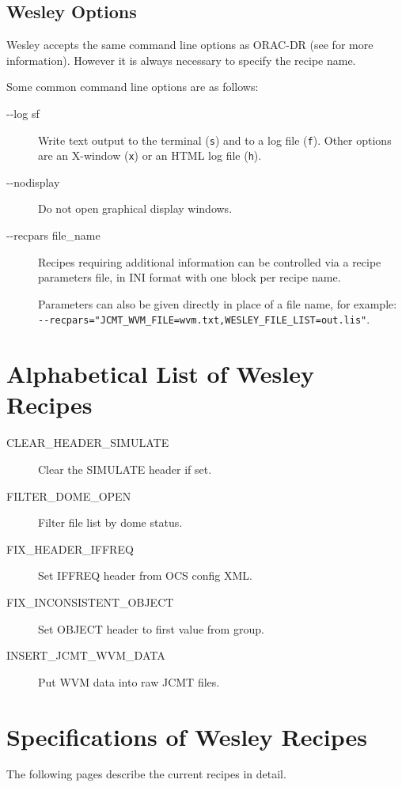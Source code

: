 \documentclass[twoside,11pt,nolof]{starlink}
\begin{document}

\subsection{Wesley Options}

Wesley accepts the same command line options as ORAC-DR
(see \oracdrsun{} for more information).
However it is always necessary to specify the recipe name.

Some common command line options are as follows:

\begin{description}
\item[-{}-log sf] \mbox{}

Write text output to the terminal (\texttt{s}) and to a log file
(\texttt{f}).
Other options are an X-window (\texttt{x}) or an HTML log file (\texttt{h}).

\item[-{}-nodisplay] \mbox{}

Do not open graphical display windows.

\item[-{}-recpars file\_name] \mbox{}

Recipes requiring additional information can be controlled via
a recipe parameters file, in INI format with one block per recipe name.

Parameters can also be given directly in place of a file name,
for example:
\\ \texttt{-{}-recpars="JCMT\_WVM\_FILE=wvm.txt,WESLEY\_FILE\_LIST=out.lis"}.

\end{description}

\newpage
\appendix

\section{Alphabetical List of Wesley Recipes\label{ap:list}}

\begin{description}
\item[CLEAR\_HEADER\_SIMULATE] \mbox {}
Clear the SIMULATE header if set.

\item[FILTER\_DOME\_OPEN] \mbox {}
Filter file list by dome status.

\item[FIX\_HEADER\_IFFREQ] \mbox {}
Set IFFREQ header from OCS config XML.

\item[FIX\_INCONSISTENT\_OBJECT] \mbox {}
Set OBJECT header to first value from group.

\item[INSERT\_JCMT\_WVM\_DATA] \mbox{}
Put WVM data into raw JCMT files.
\end{description}

\newpage

\section{Specifications of Wesley Recipes\label{ap:full}}

The following pages describe the current \wesley{} recipes in detail.


\end{document}
